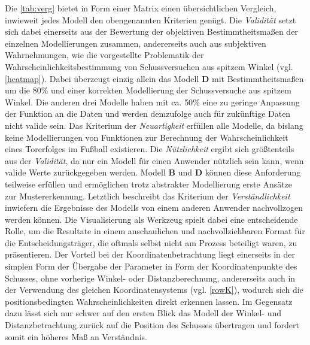 Die \vref{tab:verg} bietet in Form einer Matrix einen übersichtlichen Vergleich, inwieweit jedes Modell den obengenannten Kriterien genügt. Die \textit{Validität} setzt sich dabei einerseits aus der Bewertung der objektiven Bestimmtheitsmaßen der einzelnen Modellierungen zusammen, andererseits auch aus subjektiven Wahrnehmungen, wie die vorgestellte Problematik der Wahrscheinlichkeitsbestimmung von Schussversuchen aus spitzem Winkel (vgl. \vref{heatmap}). Dabei überzeugt einzig allein das Modell \textbf{D} mit Bestimmtheitsmaßen um die \textsf{80}\% und einer korrekten Modellierung der Schussversuche aus spitzem Winkel. Die anderen drei Modelle haben mit ca. \textsf{50}\% eine zu geringe Anpassung der Funktion an die Daten und werden demzufolge auch für zukünftige Daten nicht valide sein. Das Kriterium der \textit{Neuartigkeit} erfüllen alle Modelle, da bislang keine Modellierungen von Funktionen zur Berechnung der Wahrscheinlichkeit eines Torerfolges im Fußball existieren. Die \textit{Nützlichkeit} ergibt sich größtenteils aus der \textit{Validität}, da nur ein Modell für einen Anwender nützlich sein kann, wenn valide Werte zurückgegeben werden. Modell \textbf{B} und \textbf{D} können diese Anforderung teilweise erfüllen und ermöglichen trotz abstrakter Modellierung erste Ansätze zur Mustererkennung. Letztlich beschreibt das Kriterium der \textit{Verständlichkeit} inwiefern die Ergebnisse des Modells von einem anderen Anwender nachvollzogen werden können. Die Visualisierung als Werkzeug spielt dabei eine entscheidende Rolle, um die Resultate in einem anschaulichen und nachvollziehbaren Format für die Entscheidungsträger, die oftmals selbst nicht am Prozess beteiligt waren, zu präsentieren. Der Vorteil bei der Koordinatenbetrachtung liegt einerseits in der simplen Form der Übergabe der Parameter in Form der Koordinatenpunkte des Schusses, ohne vorherige Winkel- oder Distanzberechnung, andererseits auch in der Verwendung des gleichen Koordinatensystems (vgl. \vref{rowK}), wodurch sich die positionsbedingten Wahrscheinlichkeiten direkt erkennen lassen. Im Gegensatz dazu lässt sich nur schwer auf den ersten Blick das Modell der Winkel- und Distanzbetrachtung zurück auf die Position des Schusses übertragen und fordert somit ein höheres Maß an Verständnis.


